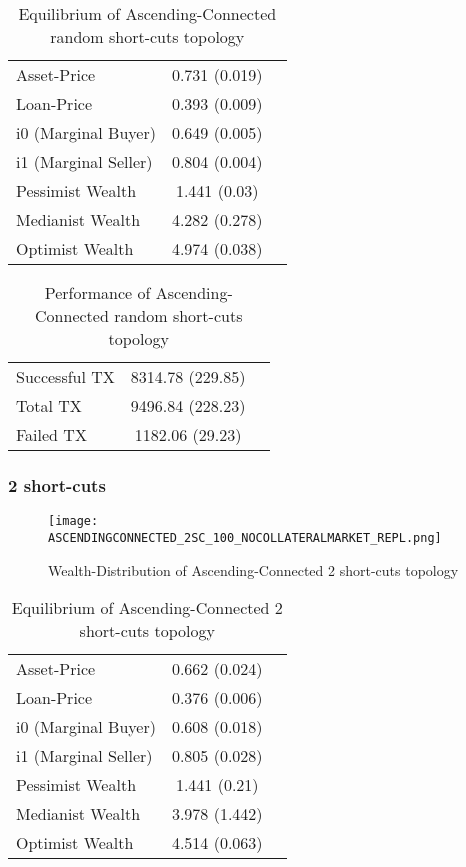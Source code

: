 \documentclass[Bachelorarbeit.tex]{subfiles}
\begin{document}
\begin{table}[h]
	\caption{Equilibrium of Ascending-Connected random short-cuts topology}
	\centering
	\begin{tabular} { l c r }
		\hline
		Asset-Price & 0.731 (0.019) \\
		Loan-Price & 0.393 (0.009) \\
		i0 (Marginal Buyer) & 0.649 (0.005) \\
		i1 (Marginal Seller) & 0.804 (0.004) \\
		Pessimist Wealth & 1.441 (0.03) \\
		Medianist Wealth & 4.282 (0.278) \\
		Optimist Wealth & 4.974 (0.038) \\
		\hline
	\end{tabular}
\end{table} 

\begin{table}[h]
	\caption{Performance of Ascending-Connected random short-cuts topology}
	\centering
	\begin{tabular} { l c r }
		\hline
		Successful TX & 8314.78 (229.85) \\
		Total TX & 9496.84 (228.23) \\
		Failed TX & 1182.06 (29.23) \\
		\hline
	\end{tabular}
\end{table}

\subsubsection{2 short-cuts}
\begin{figure}[H]
	\centering
  \texttt{[image: ASCENDINGCONNECTED\_2SC\_100\_NOCOLLATERALMARKET\_REPL.png]}
	\caption{Wealth-Distribution of Ascending-Connected 2 short-cuts topology}
	\label{fig1}
\end{figure}

\begin{table}[h]
	\caption{Equilibrium of Ascending-Connected 2 short-cuts topology}
	\centering
	\begin{tabular} { l c r }
		\hline
		Asset-Price & 0.662 (0.024) \\
		Loan-Price & 0.376 (0.006) \\
		i0 (Marginal Buyer) & 0.608 (0.018) \\
		i1 (Marginal Seller) & 0.805 (0.028) \\
		Pessimist Wealth & 1.441 (0.21) \\
		Medianist Wealth & 3.978 (1.442) \\
		Optimist Wealth & 4.514 (0.063) \\
		\hline
	\end{tabular}
\end{table} 
\end{document}
